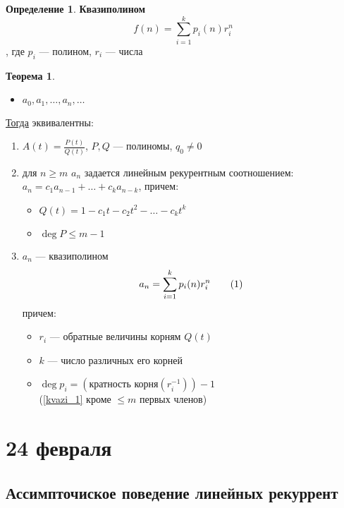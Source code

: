 \documentclass[oneside]{book}
\newcommand\addtag{\refstepcounter{equation}\tag{\theequation}}
\theoremstyle{plain}
\theoremstyle{remark}
\theoremstyle{definition}
\newtheorem{theorem}{Теорема}[section]
\newtheorem*{definition}{Определение}
\begin{document}
\begin{definition}
\textbf{Квазиполином}
\[ f(n) = \sum_{i = 1}^k p_i(n)r_i^n \], где \(p_i\) --- полином, \(r_i\) --- числа
\end{definition}
\begin{theorem}
\begin{itemize}
\item \(a_0, a_1, \dots, a_n, \dots\)
\end{itemize}
\uline{Тогда} эквивалентны:
\begin{enumerate}
\item \(A(t) = \frac{P(t)}{Q(t)}\), \(P, Q\) --- полиномы, \(q_0 \neq 0\)
\item для \(n \ge m\) \(a_n\) задается линейным рекурентным соотношением: \(a_n = c_1a_{n - 1} + \dots + c_ka_{n - k}\), причем:
\begin{itemize}
\item \(Q(t) = 1 - c_1t - c_2t^2 - \dots - c_kt^k\)
\item \(\deg P \le m - 1\)
\end{itemize}
\item \(a_n\) --- квазиполином \[ a_n = \sum_{i = 1}^k p_i(n)r_i^n \label{kvazi_1}\addtag \]
причем:
\begin{itemize}
\item \(r_i\) --- обратные величины корням \(Q(t)\)
\item \(k\) --- число различных его корней
\item \(\deg p_i = (\text{кратность корня}(r_i^{-1})) - 1\) \\
(\ref{kvazi_1} кроме \(\le m\) первых членов)
\end{itemize}
\end{enumerate}
\end{theorem}
\chapter{24 февраля}
\label{sec:orge2a19fa}
\section{Ассимпточиское поведение линейных рекуррент}
\label{sec:orgfce7598}
\end{document}
